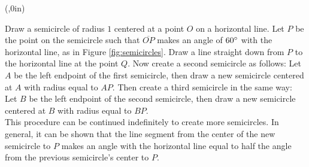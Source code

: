 {\begin{enumerate}[\bfseries 1.]
\piccaption[]{\label{fig:semicircles}}\parpic(\textwidth,0in){\piccaptioninside}
 \par\mbox{}\newline\vspace{1mm}
Draw a semicircle of radius $1$ centered at a point $O$ on a horizontal line. Let $P$ be the point
on the semicircle such that $\overline{OP}$ makes an angle of $60^\circ$ with the horizontal line,
as in Figure \ref{fig:semicircles}. Draw a line straight down from $P$ to the horizontal line at the
point $Q$.
Now create a second semicircle as follows: Let $A$ be the left endpoint of the first semicircle,
then draw a new semicircle centered at $A$ with radius equal to $AP$. Then create a third semicircle
in the same way: Let $B$ be the left endpoint of the second semicircle, then draw a new semicircle
centered at $B$ with radius equal to $BP$.\vspace{1.5mm}\\This procedure can be continued indefinitely
to create more semicircles. In general, it can be shown
that the line segment from the center of the new semicircle to $P$ makes an angle with the
horizontal line equal to half the angle from the previous semicircle's center to $P$.


\end{enumerate}}
